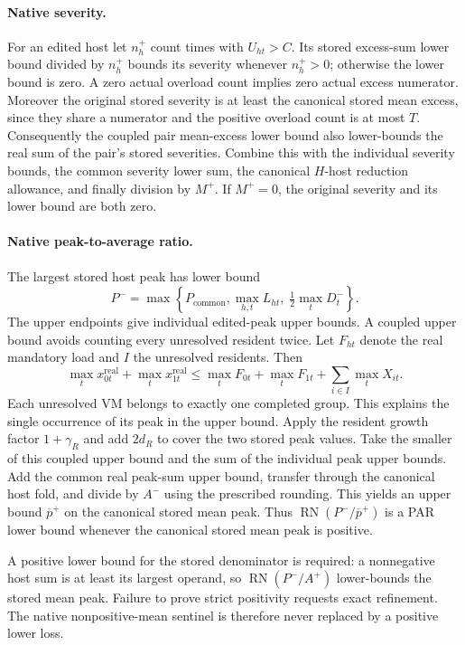 \documentclass[11pt]{article}
\begin{document}
\paragraph{Native severity.}
For an edited host let $n_h^+$ count times with $U_{ht}>C$. Its stored excess-sum lower bound divided by $n_h^+$ bounds its severity whenever $n_h^+>0$; otherwise the lower bound is zero.  A zero actual overload count implies zero actual excess numerator.  Moreover the original stored severity is at least the canonical stored mean excess, since they share a numerator and the positive overload count is at most $T$. Consequently the coupled pair mean-excess lower bound also lower-bounds the real sum of the pair's stored severities.  Combine this with the individual severity bounds, the common severity lower sum, the canonical $H$-host reduction allowance, and finally division by $M^+$.  If $M^+=0$, the original severity and its lower bound are both zero.

\paragraph{Native peak-to-average ratio.}
The largest stored host peak has lower bound
\[
 P^- = \max\left\{P_{\mathrm{common}},
                \max_{h,t}L_{ht},\;\tfrac12\max_tD^-_t\right\}.
\]
The upper endpoints give individual edited-peak upper bounds.  A coupled upper bound avoids counting every unresolved resident twice.  Let $F_{ht}$ denote the real mandatory load and $I$ the unresolved residents.  Then
\[
 \max_tx_{0t}^{\mathrm{real}}+\max_tx_{1t}^{\mathrm{real}}
 \le\max_tF_{0t}+\max_tF_{1t}
             +\sum_{i\in I}\max_tX_{it}.
\]
Each unresolved VM belongs to exactly one completed group.  This explains the single occurrence of its peak in the upper bound.  Apply the resident growth factor $1+\gamma_R$ and add $2d_R$ to cover the two stored peak values. Take the smaller of this coupled upper bound and the sum of the individual peak upper bounds.  Add the common real peak-sum upper bound, transfer through the canonical host fold, and divide by $A^-$ using the prescribed rounding. This yields an upper bound $\overline p^+$ on the canonical stored mean peak. Thus $\operatorname{RN}(P^-/\overline p^+)$ is a PAR lower bound whenever the canonical stored mean peak is positive.

A positive lower bound for the stored denominator is required: a nonnegative host sum is at least its largest operand, so $\operatorname{RN}(P^-/A^+)$ lower-bounds the stored mean peak.  Failure to prove strict positivity requests exact refinement.  The native nonpositive-mean sentinel is therefore never replaced by a positive lower loss.
\end{document}
